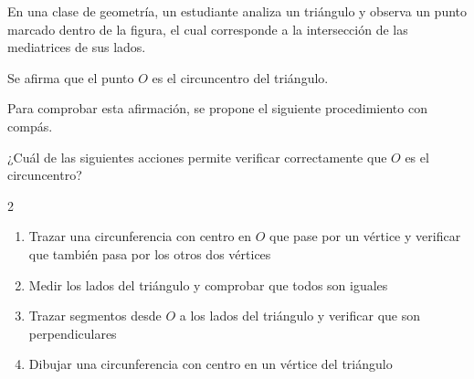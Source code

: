 En una clase de geometría, un estudiante analiza un triángulo y observa un punto marcado dentro de la figura, el cual corresponde a la intersección de las mediatrices de sus lados.

\begin{center}
\end{center}

Se afirma que el punto $O$ es el circuncentro del triángulo.

Para comprobar esta afirmación, se propone el siguiente procedimiento con compás.

¿Cuál de las siguientes acciones permite verificar correctamente que $O$ es el circuncentro?

\begin{multicols}{2}
\begin{enumerate}[label=\alph*), leftmargin=*]
\item Trazar una circunferencia con centro en $O$ que pase por un vértice y verificar que también pasa por los otros dos vértices
\item Medir los lados del triángulo y comprobar que todos son iguales
\item Trazar segmentos desde $O$ a los lados del triángulo y verificar que son perpendiculares
\item Dibujar una circunferencia con centro en un vértice del triángulo
\end{enumerate}
\end{multicols}